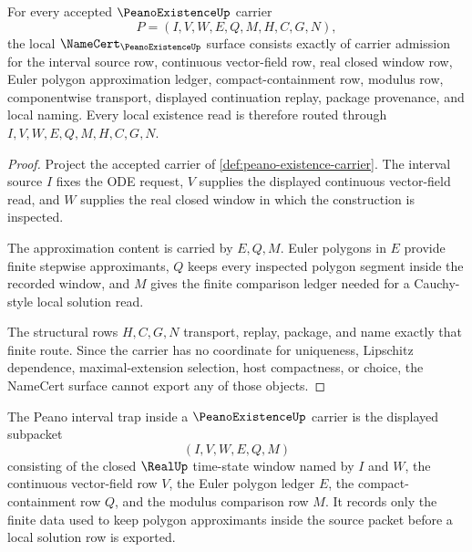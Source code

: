 \begin{theorem}
\label{thm:peano-existence-namecert-obligations}
For every accepted $\PeanoExistenceUp$ carrier
$$
P=(I,V,W,E,Q,M,H,C,G,N),
$$
the local $\NameCert_{\PeanoExistenceUp}$ surface consists exactly of carrier admission for the interval source row, continuous vector-field row, real closed window row, Euler polygon approximation ledger, compact-containment row, modulus row, componentwise transport, displayed continuation replay, package provenance, and local naming. Every local existence read is therefore routed through $I,V,W,E,Q,M,H,C,G,N$.
\end{theorem}
\begin{proof}
Project the accepted carrier of \autoref{def:peano-existence-carrier}. The interval source $I$ fixes the ODE request, $V$ supplies the displayed continuous vector-field read, and $W$ supplies the real closed window in which the construction is inspected.

The approximation content is carried by $E,Q,M$. Euler polygons in $E$ provide finite stepwise approximants, $Q$ keeps every inspected polygon segment inside the recorded window, and $M$ gives the finite comparison ledger needed for a Cauchy-style local solution read.

The structural rows $H,C,G,N$ transport, replay, package, and name exactly that finite route. Since the carrier has no coordinate for uniqueness, Lipschitz dependence, maximal-extension selection, host compactness, or choice, the NameCert surface cannot export any of those objects.
\end{proof}

\begin{definition}\label{def:peano-interval-trap-carrier}
The Peano interval trap inside a $\PeanoExistenceUp$ carrier is the displayed subpacket
$$
(I,V,W,E,Q,M)
$$
consisting of the closed $\RealUp$ time-state window named by $I$ and $W$, the continuous vector-field row $V$, the Euler polygon ledger $E$, the compact-containment row $Q$, and the modulus comparison row $M$. It records only the finite data used to keep polygon approximants inside the source packet before a local solution row is exported.
\end{definition}

